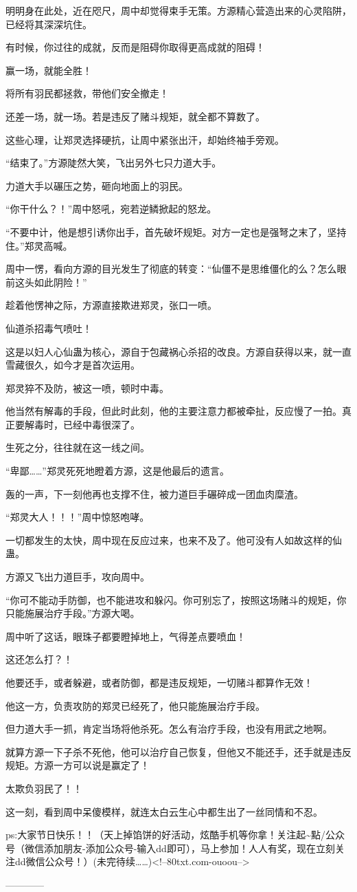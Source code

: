 \begin{this_body}
明明身在此处，近在咫尺，周中却觉得束手无策。方源精心营造出来的心灵陷阱，已经将其深深坑住。

有时候，你过往的成就，反而是阻碍你取得更高成就的阻碍！

赢一场，就能全胜！

将所有羽民都拯救，带他们安全撤走！

还差一场，就一场。若是违反了赌斗规矩，就全都不算数了。

这些心理，让郑灵选择硬抗，让周中紧张出汗，却始终袖手旁观。

“结束了。”方源陡然大笑，飞出另外七只力道大手。

力道大手以碾压之势，砸向地面上的羽民。

“你干什么？！”周中怒吼，宛若逆鳞掀起的怒龙。

“不要中计，他是想引诱你出手，首先破坏规矩。对方一定也是强弩之末了，坚持住。”郑灵高喊。

周中一愣，看向方源的目光发生了彻底的转变：“仙僵不是思维僵化的么？怎么眼前这头如此阴险！”

趁着他愣神之际，方源直接欺进郑灵，张口一喷。

仙道杀招毒气喷吐！

这是以妇人心仙蛊为核心，源自于包藏祸心杀招的改良。方源自获得以来，就一直雪藏很久，如今才是首次运用。

郑灵猝不及防，被这一喷，顿时中毒。

他当然有解毒的手段，但此时此刻，他的主要注意力都被牵扯，反应慢了一拍。真正要解毒时，已经中毒很深了。

生死之分，往往就在这一线之间。

“卑鄙……”郑灵死死地瞪着方源，这是他最后的遗言。

轰的一声，下一刻他再也支撑不住，被力道巨手碾碎成一团血肉糜渣。

“郑灵大人！！！”周中惊怒咆哮。

一切都发生的太快，周中现在反应过来，也来不及了。他可没有人如故这样的仙蛊。

方源又飞出力道巨手，攻向周中。

“你可不能动手防御，也不能进攻和躲闪。你可别忘了，按照这场赌斗的规矩，你只能施展治疗手段。”方源大喝。

周中听了这话，眼珠子都要瞪掉地上，气得差点要喷血！

这还怎么打？！

他要还手，或者躲避，或者防御，都是违反规矩，一切赌斗都算作无效！

他这一方，负责攻防的郑灵已经死了，他只能施展治疗手段。

但力道大手一抓，肯定当场将他杀死。怎么有治疗手段，也没有用武之地啊。

就算方源一下子杀不死他，他可以治疗自己恢复，但他又不能还手，还手就是违反规矩。方源一方可以说是赢定了！

太欺负羽民了！！

这一刻，看到周中呆傻模样，就连太白云生心中都生出了一丝同情和不忍。

ps:大家节日快乐！！（天上掉馅饼的好活动，炫酷手机等你拿！关注起\~{}點/公众号（微信添加朋友-添加公众号-输入dd即可），马上参加！人人有奖，现在立刻关注dd微信公众号！）(未完待续……)<!--80txt.com-ouoou-->

------------

\end{this_body}

